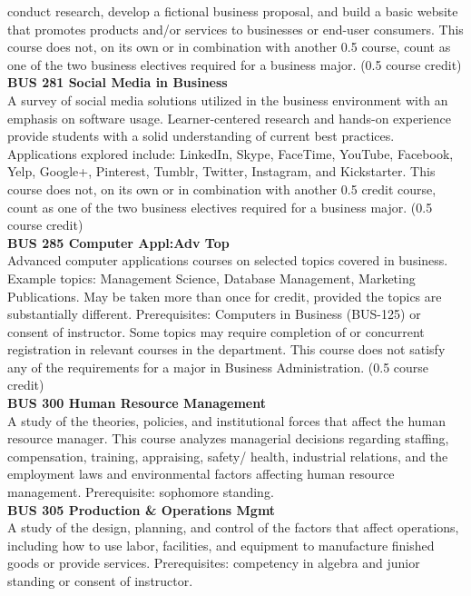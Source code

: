 \documentclass[
  letterpaper,
]{scrbook}
\begin{document}
conduct research, develop a fictional business proposal, and build a
basic website that promotes products and/or services to businesses or
end-user consumers. This course does not, on its own or in combination
with another 0.5 course, count as one of the two business electives
required for a business major. (0.5 course credit)\\
\textbf{BUS 281 Social Media in Business}\\
A survey of social media solutions utilized in the business environment
with an emphasis on software usage. Learner-centered research and
hands-on experience provide students with a solid understanding of
current best practices. Applications explored include: LinkedIn, Skype,
FaceTime, YouTube, Facebook, Yelp, Google+, Pinterest, Tumblr, Twitter,
Instagram, and Kickstarter. This course does not, on its own or in
combination with another 0.5 credit course, count as one of the two
business electives required for a business major. (0.5 course credit)\\
\textbf{BUS 285 Computer Appl:Adv Top}\\
Advanced computer applications courses on selected topics covered in
business. Example topics: Management Science, Database Management,
Marketing Publications. May be taken more than once for credit, provided
the topics are substantially different. Prerequisites: Computers in
Business (BUS-125) or consent of instructor. Some topics may require
completion of or concurrent registration in relevant courses in the
department. This course does not satisfy any of the requirements for a
major in Business Administration. (0.5 course credit)\\
\textbf{BUS 300 Human Resource Management}\\
A study of the theories, policies, and institutional forces that affect
the human resource manager. This course analyzes managerial decisions
regarding staffing, compensation, training, appraising, safety/ health,
industrial relations, and the employment laws and environmental factors
affecting human resource management. Prerequisite: sophomore standing.\\
\textbf{BUS 305 Production \& Operations Mgmt}\\
A study of the design, planning, and control of the factors that affect
operations, including how to use labor, facilities, and equipment to
manufacture finished goods or provide services. Prerequisites:
competency in algebra and junior standing or consent of instructor.\\
\end{document}
